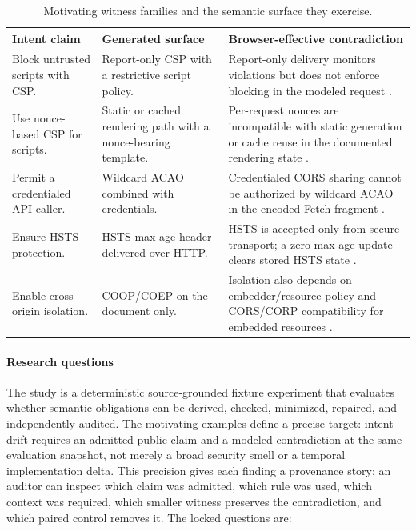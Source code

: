 \documentclass[10pt,conference]{IEEEtran}
\begin{document}
\begin{table}[t]
\centering
\caption{Motivating witness families and the semantic surface they exercise.}
\label{tab:motivation}
\begin{tabular}{p{}p{}p{}}
\toprule
Intent claim & Generated surface & Browser-effective contradiction \\
\midrule
Block untrusted scripts with CSP. & Report-only CSP with a restrictive script policy. & Report-only delivery monitors violations but does not enforce blocking in the modeled request \cite{w3c_csp3_2026,mdn_csp_header_2026}. \\
Use nonce-based CSP for scripts. & Static or cached rendering path with a nonce-bearing template. & Per-request nonces are incompatible with static generation or cache reuse in the documented rendering state \cite{nextjs_csp_2026,rails_csp_api_2026}. \\
Permit a credentialed API caller. & Wildcard ACAO combined with credentials. & Credentialed CORS sharing cannot be authorized by wildcard ACAO in the encoded Fetch fragment \cite{whatwg_fetch_2026,mdn_cors_2026,mdn_acao_2026,mdn_acac_2026}. \\
Ensure HSTS protection. & HSTS max-age header delivered over HTTP. & HSTS is accepted only from secure transport; a zero max-age update clears stored HSTS state \cite{rfc6797_hsts,mdn_hsts_2026}. \\
Enable cross-origin isolation. & COOP/COEP on the document only. & Isolation also depends on embedder/resource policy and CORS/CORP compatibility for embedded resources \cite{mdn_coep_2026,mdn_corp_header_2026,mdn_coop_2026}. \\
\bottomrule
\end{tabular}
\end{table}

\paragraph{Research questions}

The study is a deterministic source-grounded fixture experiment that evaluates whether semantic obligations can be derived, checked, minimized, repaired, and independently audited.  The motivating examples define a precise target: intent drift requires an admitted public claim and a modeled contradiction at the same evaluation snapshot, not merely a broad security smell or a temporal implementation delta.  This precision gives each finding a provenance story: an auditor can inspect which claim was admitted, which rule was used, which context was required, which smaller witness preserves the contradiction, and which paired control removes it. The locked questions are:
\end{document}
